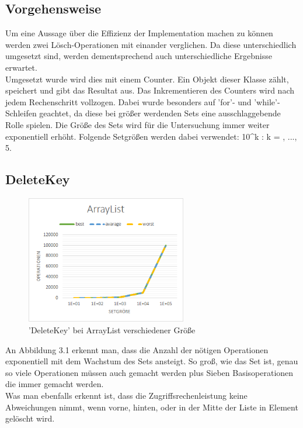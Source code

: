 \documentclass[paper=a4, fontsize=11pt]{scrartcl} %
\numberwithin{equation}{section} %
\numberwithin{figure}{section} %
\numberwithin{table}{section} %
\begin{document}
\subsection{Vorgehensweise}
Um eine Aussage über die Effizienz der Implementation machen zu können werden zwei Lösch-Operationen mit einander verglichen. Da diese unterschiedlich umgesetzt sind, werden dementsprechend auch unterschiedliche Ergebnisse erwartet.\\

Umgesetzt wurde wird dies mit einem Counter. Ein Objekt dieser Klasse zählt, speichert und gibt das Resultat aus. Das Inkrementieren des Counters wird nach jedem Rechenschritt vollzogen. Dabei wurde besonders auf 'for'- und 'while'-Schleifen geachtet, da diese bei größer werdenden Sets eine ausschlaggebende Rolle spielen. Die Größe des Sets wird für die Untersuchung immer weiter exponentiell erhöht. Folgende Setgrößen werden dabei verwendet: 10^{k} : k = \left{}, ..., 5\right\rbrace .\\

\subsection{DeleteKey}
\begin{figure}[h]
	\begin{center}
		\includegraphics[width=7cm]{grafiken/DeleteKey-ArrayList.png}
		\caption{'DeleteKey' bei ArrayList verschiedener Größe}
	\end{center}
\end{figure}
\newpage
An Abbildung 3.1 erkennt man, dass die Anzahl der nötigen Operationen exponentiell mit dem Wachstum des Sets ansteigt. So groß, wie das Set ist, genau so viele Operationen müssen auch gemacht werden plus Sieben Basisoperationen die immer gemacht werden.\\ 
Was man ebenfalls erkennt ist, dass die Zugriffsrechenleistung keine Abweichungen nimmt, wenn vorne, hinten, oder in der Mitte der Liste in Element gelöscht wird.  
\end{document}
